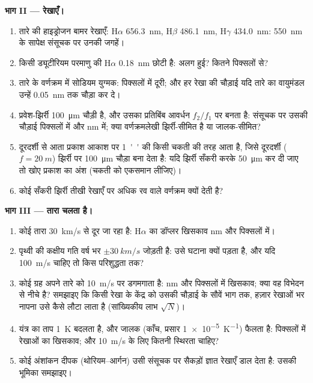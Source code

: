 \begin{problem}
\medskip
\noindent\textbf{भाग II --- रेखाएँ।}
\begin{enumerate}[resume]
  \item तारे की हाइड्रोजन बामर रेखाएँ: H$\alpha$ \qty{656.3}{nm},
        H$\beta$ \qty{486.1}{nm}, H$\gamma$ \qty{434.0}{nm}: \qty{550}{nm} के सापेक्ष
        संसूचक पर उनकी जगहें।
  \item किसी ड्यूटीरियम परमाणु की H$\alpha$ \qty{0.18}{nm} छोटी है: अलग हुई?
        कितने पिक्सलों से?
  \item तारे के वर्णक्रम में सोडियम युग्मक: पिक्सलों में
        दूरी; और हर रेखा की चौड़ाई यदि तारे का वायुमंडल
        उन्हें \qty{0.05}{nm} तक चौड़ा कर दे।
  \item प्रवेश-झिर्री \qty{100}{\micro m} चौड़ी है, और उसका प्रतिबिंब
        आवर्धन $f_2/f_1$ पर बनता है: संसूचक पर उसकी चौड़ाई पिक्सलों में और
        nm में; क्या वर्णक्रमलेखी झिर्री-सीमित है या जालक-सीमित?
  \item दूरदर्शी से आता प्रकाश आकाश पर \qty{1}{''} की किसी चकती की तरह
        आता है, जिसे दूरदर्शी ($f = \qty{20}{m}$) झिर्री पर \qty{100}{\micro m}
        चौड़ा बना देता है: यदि झिर्री सँकरी करके \qty{50}{\micro m} कर दी जाए तो खोए
        प्रकाश का अंश (चकती को एकसमान लीजिए)।
  \item कोई सँकरी झिर्री तीखी रेखाएँ पर अधिक रव वाले वर्णक्रम क्यों
        देती है?
\end{enumerate}

\medskip
\noindent\textbf{भाग III --- तारा चलता है।}
\begin{enumerate}[resume]
  \item कोई तारा \qty{30}{km/s} से दूर जा रहा है: H$\alpha$ का डॉप्लर खिसकाव nm
        और पिक्सलों में।
  \item पृथ्वी की कक्षीय गति वर्ष भर $\pm\qty{30}{km/s}$ जोड़ती है:
        उसे घटाना क्यों पड़ता है, और यदि \qty{100}{m/s} चाहिए तो
        किस परिशुद्धता तक?
  \item कोई ग्रह अपने तारे को \qty{10}{m/s} पर डगमगाता है: nm और
        पिक्सलों में खिसकाव; क्या वह विभेदन से नीचे है? समझाइए कि किसी रेखा के
        केंद्र को उसकी चौड़ाई के सौवें भाग तक, हज़ार रेखाओं भर
        नापना उसे कैसे लौटा लाता है (सांख्यिकीय लाभ $\sqrt{N}$)।
  \item यंत्र का ताप \qty{1}{K} बदलता है, और जालक (काँच, प्रसार
        \qty{1e-5}{K^{-1}}) फैलता है: पिक्सलों में रेखाओं का खिसकाव;
        और \qty{10}{m/s} के लिए कितनी स्थिरता चाहिए?
  \item कोई अंशांकन दीपक (थोरियम--आर्गन) उसी संसूचक पर सैकड़ों ज्ञात
        रेखाएँ डाल देता है: उसकी भूमिका समझाइए।
\end{enumerate}


\end{problem}
